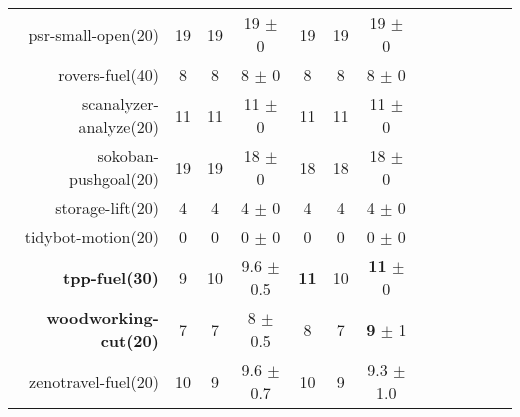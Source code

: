 \begin{center}
\begin{tabular}{|r|*{4}{ccc|}}
psr-small-open(20) & 19 & 19 & 19 $\pm$ 0 & 19 & 19 & 19 $\pm$ 0\\
rovers-fuel(40) & 8 & 8 & 8 $\pm$ 0 & 8 & 8 & 8 $\pm$ 0\\
scanalyzer-analyze(20) & 11 & 11 & 11 $\pm$ 0 & 11 & 11 & 11 $\pm$ 0\\
sokoban-pushgoal(20) & 19 & 19 & 18 $\pm$ 0 & 18 & 18 & 18 $\pm$ 0\\
storage-lift(20) & 4 & 4 & 4 $\pm$ 0 & 4 & 4 & 4 $\pm$ 0\\
tidybot-motion(20) & 0 & 0 & 0 $\pm$ 0 & 0 & 0 & 0 $\pm$ 0\\
\textbf{tpp-fuel(30)} & 9 & 10 & 9.6 $\pm$ 0.5 & \textbf{11} & 10 & \textbf{11} $\pm$ 0\\
\textbf{woodworking-cut(20)} & 7 & 7 & 8 $\pm$ 0.5 & 8 & 7 & \textbf{9} $\pm$ 1\\
zenotravel-fuel(20) & 10 & 9 & 9.6 $\pm$ 0.7 & 10 & 9 & 9.3 $\pm$ 1.0\\
\end{tabular}
\end{center}
